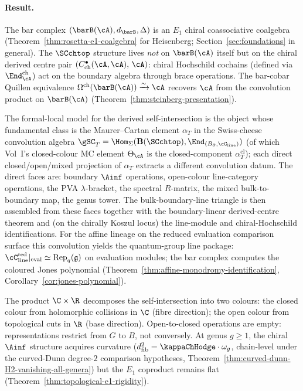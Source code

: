 \paragraph{Result.}
The bar complex $(\barB(\cA), d_{\barB}, \Delta)$ is an
$E_1$ chiral coassociative coalgebra
(Theorem~\ref{thm:rosetta-e1-coalgebra} for Heisenberg;
Section~\ref{sec:foundations} in general). The $\SCchtop$
structure lives \emph{not} on $\barB(\cA)$ itself but on the
chiral derived centre pair
$(C^\bullet_{\mathrm{ch}}(\cA, \cA),\, \cA)$: chiral Hochschild
cochains (defined via $\End^{\mathrm{ch}}_\cA$) act on the
boundary algebra through brace operations. The bar-cobar
Quillen equivalence
$\Omega^{\mathrm{ch}}(\barB(\cA)) \xrightarrow{\sim} \cA$
recovers $\cA$ from the convolution product on $\barB(\cA)$
(Theorem~\ref{thm:steinberg-presentation}).

The formal-local model for the derived self-intersection is the
object whose fundamental class is the Maurer--Cartan element
$\alpha_T$ in the Swiss-cheese convolution algebra
$\gSC_T = \Hom_\Sigma(\mathbf B(\SCchtop), \End_{(\Bbound,
\cC_{\mathrm{line}})})$ (of which Vol~I's closed-colour MC element
$\Theta_\cA$ is the closed-component $\alpha_T^{\mathrm{cl}}$);
each direct closed/open/mixed projection of $\alpha_T$ extracts
a different convolution datum. The direct faces are: boundary
$\Ainf$ operations, open-colour line-category operations, the
PVA $\lambda$-bracket, the spectral $R$-matrix, the mixed
bulk-to-boundary map, the genus tower. The bulk-boundary-line
triangle is then assembled from these faces together with the
boundary-linear derived-centre theorem and (on the chirally
Koszul locus) the line-module and chiral-Hochschild
identifications. For the affine lineage on the reduced
evaluation comparison surface this convolution yields the
quantum-group line package:
$\cC_{\mathrm{line}}^{\mathrm{red}}|_{\mathrm{eval}} \simeq
\operatorname{Rep}_q(\fg)$ on evaluation modules; the bar
complex computes the coloured Jones polynomial
(Theorem~\ref{thm:affine-monodromy-identification},
Corollary~\ref{cor:jones-polynomial}).

The product $\C \times \R$ decomposes the self-intersection into
two colours: the closed colour from holomorphic collisions in
$\C$ (fibre direction); the open colour from topological cuts
in $\R$ (base direction). Open-to-closed operations are empty:
representations restrict from $G$ to $B$, not conversely. At
genus $g \ge 1$, the chiral $\Ainf$ structure acquires curvature
($d^2_{\mathrm{fib}} = \kappaChHodge \cdot \omega_g$,
chain-level under the curved-Dunn degree-$2$ comparison hypotheses,
Theorem~\ref{thm:curved-dunn-H2-vanishing-all-genera}) but the
$E_1$ coproduct remains flat
(Theorem~\ref{thm:topological-e1-rigidity}).

